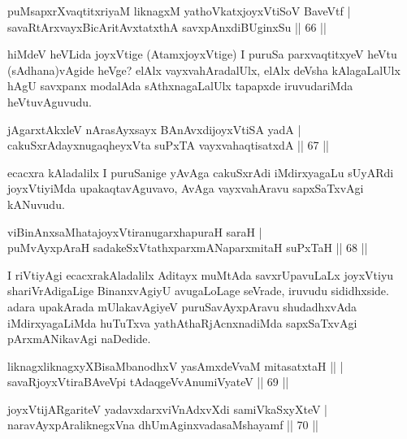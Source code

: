 \begin{shl}
puMsapxrXvaqtitxriyaM liknagxM yathoVkatxjoyxVtiSoV BaveVtf | \\
savaRtArxvayxBicAritAvxtatxthA savxpAnxdiBUginxSu \hfill ||  66 ||  
\end{shl}

\begin{artha}
hiMdeV heVLida joyxVtige (AtamxjoyxVtige) I puruSa parxvaqtitxyeV heVtu (sAdhana)vAgide heVge? elAlx vayxvahAradalUlx, elAlx deVsha kAlagaLalUlx hAgU savxpanx modalAda sAthxnagaLalUlx tapapxde iruvudariMda heVtuvAguvudu.
\end{artha}


\begin{shl}
jAgarxtAkxleV nArasAyxsayx BAnAvxdijoyxVtiSA yadA | \\
cakuSxrAdayxnugaqheyxVta suPxTA vayxvahaqtisatxdA \hfill||  67 ||  
\end{shl}

\begin{artha}
ecacxra kAladalilx I puruSanige yAvAga cakuSxrAdi iMdirxyagaLu sUyARdi joyxVtiyiMda upakaqtavAguvavo, AvAga vayxvahAravu sapxSaTxvAgi kANuvudu.
\end{artha}

\begin{shl}
viBinAnxsaMhatajoyxVtiranugarxhapuraH saraH | \\
puMvAyxpAraH sadakeSxVtathxparxmANaparxmitaH suPxTaH \hfill||  68 ||  
\end{shl}

\begin{artha}
I riVtiyAgi ecacxrakAladalilx Aditayx muMtAda savxrUpavuLaLx joyxVtiyu shariVrAdigaLige BinanxvAgiyU avugaLoLage seVrade, iruvudu sididhxside. adara upakArada mUlakavAgiyeV puruSavAyxpAravu shudadhxvAda iMdirxyagaLiMda huTuTxva yathAthaRjAcnxnadiMda sapxSaTxvAgi pArxmANikavAgi naDedide.
\end{artha}


\begin{shl}
liknagxliknagxyXBisaMbanodhxV yasAmxdeVvaM mitasatxtaH ||  | \\
savaRjoyxVtiraBAveV\s pi tAdaqgeVvAnumiVyateV \hfill||  69 || 
\end{shl}

\begin{shl}
joyxVtijARgariteV yadavxdarxviVnAdxvXdi samiVkaSxyXteV | \\
naravAyxpAraliknegxVna dhUmAginxvadasaMshayamf \hfill||  70 ||  
\end{shl}

